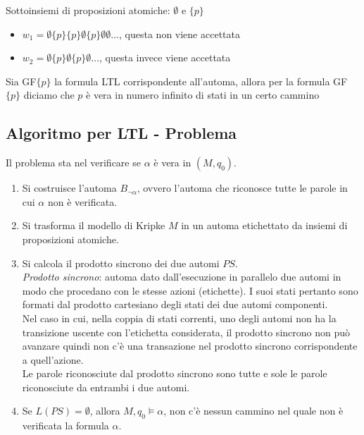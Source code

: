 \begin{enumerate}
    Sottoinsiemi di proposizioni atomiche: $\emptyset$ e $\{p\}$
    \begin{itemize}
        \item $w_1 = \emptyset\{p\}\{p\}\emptyset\{p\}\emptyset\emptyset \dots$, questa non viene accettata
        \item $w_2 = \emptyset\{p\}\emptyset\{p\}\emptyset \dots$, questa invece viene accettata
    \end{itemize}
    Sia GF$\{p\}$ la formula LTL corrispondente all'automa, allora per la formula GF$\{p\}$ diciamo che $p$ è vera in numero infinito di stati in un certo cammino
\end{enumerate}
\subsection{Algoritmo per LTL - Problema}

Il problema sta nel verificare se $\alpha$ è vera in $(M, q_0)$.
\begin{enumerate}
    \item Si costruisce l’automa $B_{\neg \alpha}$, ovvero l’automa che riconosce tutte le parole in cui $\alpha$ non è verificata.
    \item Si trasforma il modello di Kripke $M$ in un automa etichettato da insiemi di proposizioni atomiche.
    \item Si calcola il prodotto sincrono dei due automi $PS$.\\
   \textit{Prodotto sincrono}: automa dato dall’esecuzione in parallelo due automi in modo che procedano con le stesse azioni (etichette). I suoi stati pertanto sono formati dal prodotto cartesiano degli stati dei due automi componenti.\\
   Nel caso in cui, nella coppia di stati correnti, uno degli automi non ha la transizione uscente con l’etichetta considerata, il prodotto sincrono non può avanzare quindi non c’è una transazione nel prodotto sincrono corrispondente a quell’azione.\\
   
   Le parole riconosciute dal prodotto sincrono sono tutte e sole le parole riconosciute da entrambi i due automi.
   \item Se $L(PS) = \emptyset$, allora $M, q_0 \models \alpha$, non c’è nessun cammino nel quale non è verificata la formula $\alpha$.
\end{enumerate}

